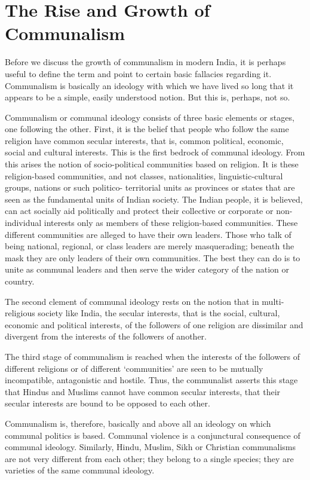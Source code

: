 \chapter{The Rise and Growth of Communalism}
\begin{multicols}{2}

Before we discuss the growth of communalism in modern India, it is perhaps useful to define the term and point to certain basic fallacies regarding it. Communalism is basically an ideology with which we have lived so long that it appears to be a simple, easily understood notion. But this is, perhaps, not so.

Communalism or communal ideology consists of three basic elements or stages, one following the other. First, it is the belief that people who follow the same religion have common secular interests, that is, common political, economic, social and cultural interests. This is the first bedrock of communal ideology. From this arises the notion of socio-political communities based on religion. It is these religion-based communities, and not classes, nationalities, linguistic-cultural groups, nations or such politico- territorial units as provinces or states that are seen as the fundamental units of Indian society. The Indian people, it is believed, can act socially aid politically and protect their collective or corporate or non-individual interests only as members of these religion-based communities. These different communities are alleged to have their own leaders. Those who talk of being national, regional, or class leaders are merely masquerading; beneath the mask they are only leaders of their own communities. The best they can do is to unite as communal leaders and then serve the wider category of the nation or country.

The second clement of communal ideology rests on the notion that in multi-religious society like India, the secular interests, that is the social, cultural, economic and political interests, of the followers of one religion are dissimilar and divergent from the interests of the followers of another.

The third stage of communalism is reached when the interests of the followers of different religions or of different `communities' are seen to be mutually incompatible, antagonistic and hostile. Thus, the communalist asserts this stage that Hindus and Muslims cannot have common secular interests, that their secular interests are bound to be opposed to each other.

Communalism is, therefore, basically and above all an ideology on which communal politics is based. Communal violence is a conjunctural consequence of communal ideology. Similarly, Hindu, Muslim, Sikh or Christian communalisms are not very different from each other; they belong to a single species; they are varieties of the same communal ideology.


\end{multicols}
